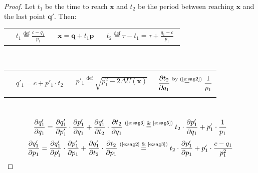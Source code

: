 \documentclass{article} %
\newcommand{\bvec}[1]{\textbf{#1}}
\begin{document}
\begin{proof}
Let $t_1$ be the time to reach $\bvec{x}$ and $t_2$ be the period between reaching $\bvec{x}$ and the last point $\bvec{q}'$.  Then:
\vspace{-10pt}
\begin{tabular}{p{3cm}p{4cm}p{5.8cm}}
{
\begin{align}\label{e:sag1}
&
t_1 \overset{\text{def}}= \frac{c - q_{1}}{p_{1}}
\end{align} }
&{
\begin{align}\label{e:sag0}
\bvec{x} = \bvec{q} + t_1 \bvec{p}
\end{align} 
}
&{
\begin{align}\label{e:sag2}
t_{2}
\overset{\text{def}}=
\tau-t_{1}=\tau+\frac{q_{1} - c}{p_{1}}
\end{align} 
}
\end{tabular}
\vspace{-12pt}
\\
\begin{tabular}{p{3cm}p{4cm}p{5.8cm}}
{\begin{align}\label{e:sag3}
&
q'_{1}=c + p'_{1}\cdot t_{2}
\end{align} }
&
{\begin{align}\label{e:sag4}
p'_1 \overset{\text{def}}= \sqrt{p_1^2 - 2 \Delta U(\bvec{x})}
\end{align} }
&
{\begin{align}\label{e:sag5}
\frac{\partial t_2}{\partial q_1} 
\overset{\text{by (\ref{e:sag2})}}=
\frac{1}{p_{1}} 
\end{align} }
\end{tabular}
\vspace{-12pt}
\\
\begin{align}\label{e:gorbe1}
\frac{\partial q'_1}{\partial q_1} 
=
\frac{\partial q'_1}{\partial p'_1} \cdot \frac{\partial p'_1}{\partial q_1}
+
\frac{\partial q'_1}{\partial t_2} \cdot \frac{\partial t_2}{\partial q_1}
\overset{\text{(\ref{e:sag3} \& \ref{e:sag5})}}
=
t_2 \cdot \frac{\partial p'_1}{\partial q_1}
+
p'_1 \cdot \frac{1}{p_1}
\end{align}
\begin{align}\label{e:gorbe2}
\frac{\partial q'_1}{\partial p_1} 
=
\frac{\partial q'_1}{\partial p'_1} \cdot \frac{\partial p'_1}{\partial p_1}
+
\frac{\partial q'_1}{\partial t_2} \cdot \frac{\partial t_2}{\partial p_1}
\overset{\text{(\ref{e:sag2} \& \ref{e:sag3})}}
=
%
t_2 \cdot \frac{\partial p'_1}{\partial p_1}
+
p'_1 \cdot \frac{c-q_1}{p_1^2}

\end{align}
\end{proof}
\end{document}
